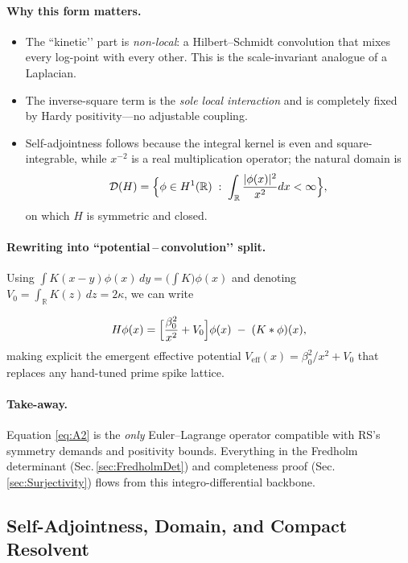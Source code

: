 \documentclass[11pt]{article}
\begin{document}
\paragraph{Why this form matters.}
\begin{itemize}
\item The “kinetic’’ part is \emph{non-local}: a Hilbert–Schmidt
      convolution that mixes every log-point with every other.  This
      is the scale-invariant analogue of a Laplacian.
\item The inverse-square term is the \emph{sole local interaction} and
      is completely fixed by Hardy positivity—no adjustable coupling.
\item Self-adjointness follows because the integral kernel is even and
      square-integrable, while \(x^{-2}\) is a real multiplication
      operator; the natural domain is
      \[
         \mathcal D(H)
         =\Bigl\{
              \phi\in H^{1}(\mathbb R)\;:\;
              \int_{\mathbb R}\frac{|\phi(x)|^{2}}{x^{2}}dx<\infty
           \Bigr\},
      \]
      on which $H$ is symmetric and closed.
\end{itemize}

\paragraph{Rewriting into ``potential – convolution’’ split.}
Using
\(
  \int K(x-y)\phi(x)\,dy = \bigl(\!\int K\bigr)\phi(x)
\)
and denoting \(V_{0}=\int_{\mathbb R}K(z)\,dz=2\kappa\), we can write

\[
   H\phi(x)
   =\Bigl[\frac{\beta_{0}^{2}}{x^{2}}+V_{0}\Bigr]\phi(x)
    \;-\;
    (K\ast\phi)(x),
\]
making explicit the emergent effective potential
\(V_{\mathrm{eff}}(x)=\beta_{0}^{2}/x^{2}+V_{0}\) that replaces any
hand-tuned prime spike lattice.

\paragraph{Take-away.}
Equation \eqref{eq:A2} is the \emph{only} Euler–Lagrange operator
compatible with RS’s symmetry demands and positivity bounds.
Everything in the Fredholm determinant (Sec.\,\ref{sec:FredholmDet})
and completeness proof (Sec.\,\ref{sec:Surjectivity}) flows from this
integro-differential backbone.

\subsection{Self-Adjointness, Domain, and Compact Resolvent}
\label{sec:SelfAdjoint}
\end{document}
